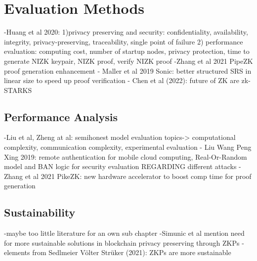 \section{Evaluation Methods}
-Huang et al 2020: 1)privacy preserving and security: confidentiality, availability, integrity, privacy-preserving, traceability, single point of failure 2) performance evaluation: computing cost, number of startup nodes, privacy protection, time to generate NIZK keypair, NIZK proof, verify NIZK proof
-Zhang et al 2021 PipeZK proof generation enhancement
- Maller et al 2019 Sonic: better structured SRS in linear size to speed up proof verification
- Chen et al (2022): future of ZK are zk-STARKS
\subsection{Performance Analysis}
-Liu et al, Zheng at al: semihonest model evaluation topics-> computational complexity, communication complexity, experimental evaluation
- Liu Wang Peng Xing 2019: remote authentication for mobile cloud computing, Real-Or-Random model and BAN logic for security evaluation REGARDING different attacks
- Zhang et al 2021 PikeZK: new hardware accelerator to boost comp time for proof generation

\subsection{Sustainability}
-maybe too little literature for an own sub chapter
-Simunic et al mention need for more sustainable solutions in blockchain privacy preserving through ZKPs
-elements from Sedlmeier Völter Strüker (2021): ZKPs are more sustainable 